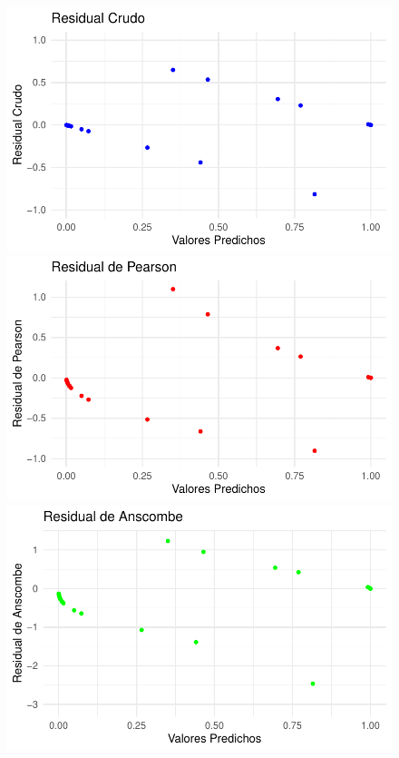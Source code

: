 \documentclass[
  letterpaper,
  DIV=11,
  numbers=noendperiod]{scrartcl}
\begin{document}
\begin{figure}

\begin{minipage}{0.50\linewidth}
\includegraphics{Modelos_files/figure-pdf/unnamed-chunk-55-1.pdf}\end{minipage}%
%
\begin{minipage}{0.50\linewidth}
\includegraphics{Modelos_files/figure-pdf/unnamed-chunk-55-2.pdf}\end{minipage}%
\newline
\begin{minipage}{0.50\linewidth}
\includegraphics{Modelos_files/figure-pdf/unnamed-chunk-55-3.pdf}\end{minipage}%

\end{figure}
\end{document}
